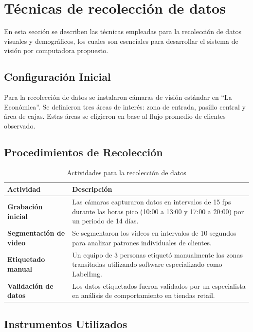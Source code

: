 \section{Técnicas de recolección de datos}

En esta sección se describen las técnicas empleadas para la recolección de datos visuales y demográficos, los cuales son esenciales para desarrollar el sistema de visión por computadora propuesto.

\subsection{Configuración Inicial}

Para la recolección de datos se instalaron cámaras de visión estándar en ``La Económica''. Se definieron tres áreas de interés: zona de entrada, pasillo central y área de cajas. Estas áreas se eligieron en base al flujo promedio de clientes observado.

\subsection{Procedimientos de Recolección}

\begin{table}[H]
\centering
\caption{Actividades para la recolección de datos}
\label{table:recoleccion}
\begin{tabular}{|p{5cm}|p{10cm}|}
\hline
\textbf{Actividad} & \textbf{Descripción} \\ \hline
\textbf{Grabación inicial} & Las cámaras capturaron datos en intervalos de 15 fps durante las horas pico (10:00 a 13:00 y 17:00 a 20:00) por un periodo de 14 días. \\ \hline
\textbf{Segmentación de video} & Se segmentaron los videos en intervalos de 10 segundos para analizar patrones individuales de clientes. \\ \hline
\textbf{Etiquetado manual} & Un equipo de 3 personas etiquetó manualmente las zonas transitadas utilizando software especializado como LabelImg. \\ \hline
\textbf{Validación de datos} & Los datos etiquetados fueron validados por un especialista en análisis de comportamiento en tiendas retail. \\ \hline
\end{tabular}
\end{table}

\subsection{Instrumentos Utilizados}

